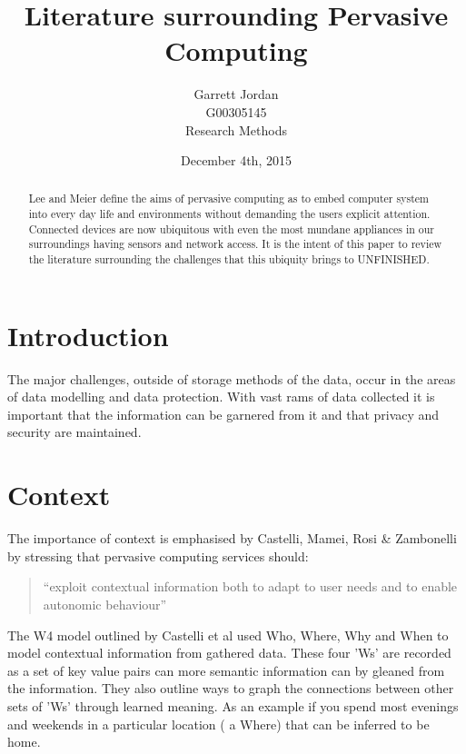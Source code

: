 \documentclass[]{report}
\title{Literature surrounding Pervasive Computing}
\author{Garrett Jordan\\G00305145\\Research Methods}
\date{December 4th, 2015}
\begin{document}
\maketitle


% 
%

\begin{abstract}
Lee and Meier define the aims of pervasive computing as to embed computer system into every day life and environments without demanding the users explicit attention\cite{1}. Connected devices are now ubiquitous with even the most mundane appliances in our surroundings having sensors and network access. It is the intent of this paper to review the literature surrounding the challenges that this ubiquity brings to UNFINISHED.
\end{abstract}

% 
%

\section{Introduction}
The major challenges, outside of storage methods of the data, occur in the areas of data modelling and data protection. With vast rams of data collected it is important that the information can be garnered from it and that privacy and security are maintained.\\

% 
%

\section{Context}
The importance of context is emphasised by Castelli, Mamei, Rosi \& Zambonelli by stressing that  pervasive computing services should:
\begin{quotation}
 ``exploit contextual information both to
 adapt to user needs and to enable autonomic behaviour''\cite{2}
\end{quotation} 

The W4 model outlined by Castelli et al used Who, Where, Why and When to model contextual information from gathered data. These four 'Ws' are recorded as a set of key value pairs can more semantic information can by gleaned from the information. They also outline ways to graph the connections between other sets of 'Ws' through learned meaning. As an example if you spend most evenings and weekends in a particular location ( a Where) that can be inferred to be home.
\end{document}
